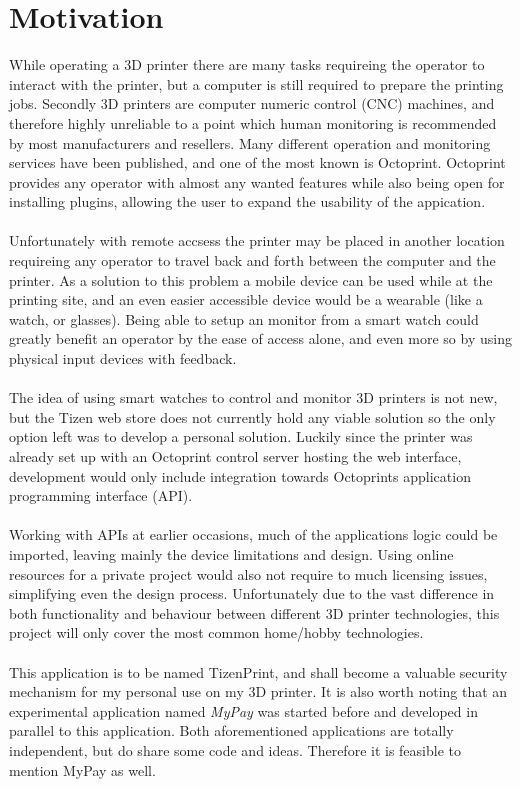 \documentclass[a4paper, 12pt]{article}
\newcommand{\mysection}[1]{\section*{#1} \addcontentsline{toc}{section}{#1}}
\begin{document}
    \mysection{Motivation}
    While operating a 3D printer there are many tasks requireing the operator to interact with the printer, but a computer is
    still required to prepare the printing jobs.
    Secondly 3D printers are computer numeric control (CNC) machines, and therefore highly unreliable to a point which 
    human monitoring is recommended by most manufacturers and resellers.
    Many different operation and monitoring services have been published, and one of the most known is Octoprint.
    Octoprint provides any operator with almost any wanted features while also being open for installing plugins, allowing the user
    to expand the usability of the appication.
    \\\\
    Unfortunately with remote accsess the printer may be placed in another location requireing any operator to travel back and forth
    between the computer and the printer.
    As a solution to this problem a mobile device can be used while at the printing site, and an even easier accessible device would 
    be a wearable (like a watch, or glasses).
    Being able to setup an monitor from a smart watch could greatly benefit an operator by the ease of access alone, and even more so
    by using physical input devices with feedback.
    \\\\
    The idea of using smart watches to control and monitor 3D printers is not new, but the Tizen web store does not
    currently hold any viable solution so the only option left was to develop a personal solution.
    Luckily since the printer was already set up with an Octoprint control server hosting the web interface, development would only
    include integration towards Octoprints application programming interface (API).
    \\\\
    Working with APIs at earlier occasions, much of the applications logic could be imported, leaving mainly the
    device limitations and design.
    Using online resources for a private project would also not require to much licensing issues, simplifying even the
    design process.
    Unfortunately due to the vast difference in both functionality and behaviour between different 3D printer
    technologies, this project will only cover the most common home/hobby technologies.
    \\\\
    This application is to be named TizenPrint, and shall become a valuable security mechanism for my personal use
    on my 3D printer.
    It is also worth noting that an experimental application named \textit{MyPay} was started before and developed
    in parallel to this application.
    Both aforementioned applications are totally independent, but do share some code and ideas.
    Therefore it is feasible to mention MyPay as well.
\end{document}
